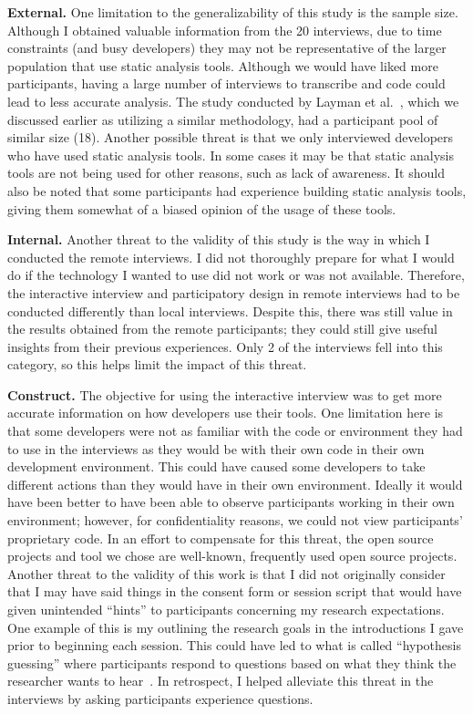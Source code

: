 \textbf{External.} One limitation to the generalizability of this study is the
sample size. Although I obtained valuable information from the 20 interviews,
due to time constraints (and busy developers) they may not be representative of
the larger population that use static analysis tools. Although we would have
liked more participants, having a large number of interviews to transcribe and
code could lead to less accurate analysis. The study conducted by Layman et
al.~\cite{Layman:2007:FaultFix}, which we discussed earlier as utilizing a
similar methodology, had a participant pool of similar size (18).
Another possible threat is that we only interviewed developers who have used
static analysis tools. In some cases it may be that static analysis tools are
not being used for other reasons, such as lack of awareness. It should also be
noted that some participants had experience building static analysis
tools, giving them somewhat of a biased opinion of the usage of these tools.


\textbf{Internal.} Another threat to the validity of this study is the way in
which I conducted the remote interviews.
I did not thoroughly prepare for what I would do if the technology I wanted
to use did not work or was not available. Therefore, the interactive interview
and participatory design in remote interviews had to be conducted differently
than local interviews. Despite this, there was still value in the results
obtained from the remote participants; they could still give useful insights
from their previous experiences. Only 2 of the interviews fell into this
category, so this helps limit the impact of this threat.

\textbf{Construct.} The objective for using the interactive interview was to get
more accurate information on how developers use their tools. One limitation here
is that some developers were not as familiar with the code or environment they
had to use in the interviews as they would be with their own code in their own
development environment. This could have caused some developers to take
different actions than they would have in their own environment. Ideally
it would have been better to have been able to observe participants working
in their own environment; however, for confidentiality reasons, we could not view participants' proprietary code. 
In an effort to compensate for this threat, the open source projects and tool we chose are well-known, frequently used open
source projects. Another threat to the validity of this work is that I did not
originally consider that I may have said things in the consent form or
session script that would have given unintended ``hints'' to participants
concerning my research expectations. One example of this is my outlining the research goals in the introductions I gave prior to beginning each session.
This could have led to what is called ``hypothesis guessing'' where participants
respond to questions based on what they think the researcher wants to
hear~\cite{Threats}. In retrospect, I helped alleviate this threat in the interviews
by asking participants experience questions.


